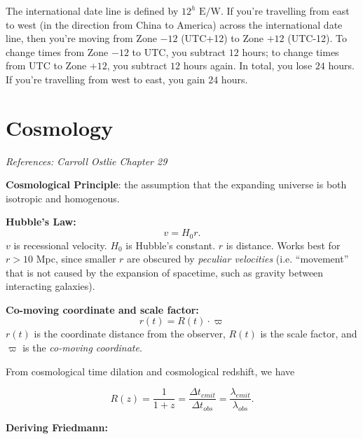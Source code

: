 \documentclass[12pt]{article}
\newcommand{\V}{

\vspace{\baselineskip}

}
\begin{document}



The international date line is defined by $12^{h}\text{ E/W}$. If you're travelling from east to west (in the direction from China to America) across the international date line, then you're moving from Zone $-12$ (UTC+12) to Zone $+12$ (UTC-12). To change times from Zone $-12$ to UTC, you subtract $12$ hours; to change times from UTC to Zone $+12$, you subtract $12$ hours again. In total, you lose $24$ hours. If you're travelling from west to east, you gain $24$ hours.

\newpage
\section{Cosmology}

\textit{References: Carroll Ostlie Chapter 29}\V

\textbf{Cosmological Principle}: the assumption that the expanding universe is both isotropic and homogenous.\V

\textbf{Hubble's Law:} 
\begin{equation*}
    v = H_0r.
\end{equation*}
$v$ is recessional velocity. $H_0$ is Hubble's constant. $r$ is distance. Works best for $r > 10$ Mpc, since smaller $r$ are obscured by \textit{peculiar velocities} (i.e. ``movement'' that is not caused by the expansion of spacetime, such as gravity between interacting galaxies). \V

\textbf{Co-moving coordinate and scale factor:}
\begin{equation*}
    r(t) = R(t)\cdot \varpi
\end{equation*}
$r(t)$ is the coordinate distance from the observer, $R(t)$ is the scale factor, and $\varpi$ is the \textit{co-moving coordinate}.

From cosmological time dilation and cosmological redshift, we have

\[R(z) = \frac{1}{1+z} = \frac{\Delta t_{emit}}{\Delta t_{obs}} = \frac{\lambda_{emit}}{\lambda_{obs}}.\]\V

\textbf{Deriving Friedmann:}
\end{document}
